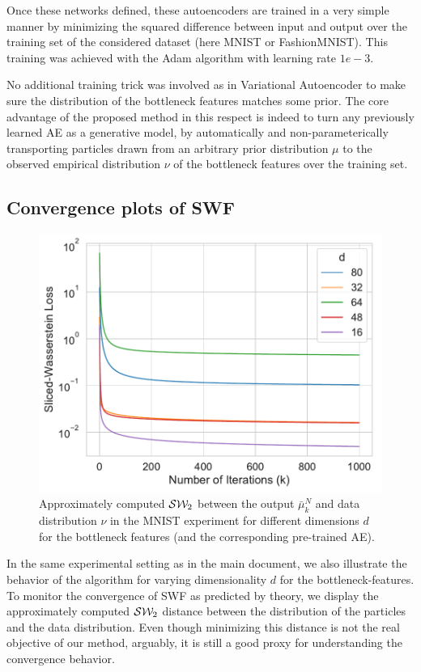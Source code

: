 Once these networks defined, these autoencoders are trained in a very simple manner by minimizing the squared difference between input and output over the training set of the considered dataset (here MNIST or FashionMNIST). This training was achieved with the Adam algorithm \cite{kingma2014adam} with learning rate $1e-3$.

No additional training trick was involved as in Variational Autoencoder \cite{kingma2013VAE} to make sure the distribution of the bottleneck features matches some prior. The core advantage of the proposed method in this respect is indeed to turn any previously learned AE as a generative model, by automatically and non-parameterically transporting particles drawn from an arbitrary prior distribution $\mu$ to the observed empirical distribution $\nu$ of the bottleneck features over the training set.

\subsection{Convergence plots of SWF}

\begin{figure}
\begin{centering}
\includegraphics[width=0.5\columnwidth]{figures/iterations.pdf}
\par\end{centering}
\caption{Approximately computed ${\cal S}{\cal W}_2$ between the output $\bar{\mu}_{k}^{N}$ and data distribution $\nu$ in the MNIST experiment for different dimensions $d$ for the bottleneck features (and the corresponding pre-trained AE).
\label{fig:supptoy_sw}}
\end{figure}

In the same experimental setting as in the main document, we also illustrate the behavior of the algorithm for varying dimensionality $d$ for the bottleneck-features. To monitor the convergence of SWF as predicted by theory, we display the approximately computed ${\cal S}{\cal W}_2$ distance between the distribution of the particles and the data distribution. Even though minimizing this distance is not the real objective of our method, arguably, it is still a good proxy for understanding the convergence behavior.

